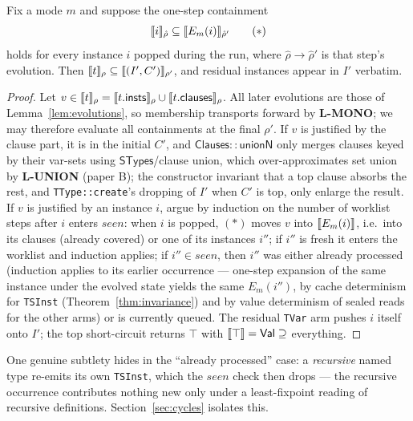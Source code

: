 \documentclass[11pt]{article}
\newcommand{\STypes}{\mathsf{STypes}}
\newcommand{\Clauses}{\mathsf{Clauses}}
\begin{document}
\begin{lemma}
\label{lem:plumbing}
Fix a mode $m$ and suppose the one-step containment
\[
\llbracket i \rrbracket_{\hat\rho} \subseteq \llbracket E_m(i) \rrbracket_{\hat\rho'}
\tag{$\ast$}
\]
holds for every instance $i$ popped during the run, where
$\hat\rho \to \hat\rho'$ is that step's evolution. Then
$\llbracket t \rrbracket_\rho \subseteq \llbracket (I', C') \rrbracket_{\rho'}$, and residual instances
appear in $I'$ verbatim.
\end{lemma}
\begin{proof}
Let $v \in \llbracket t \rrbracket_\rho = \llbracket t.\mathsf{insts} \rrbracket_\rho \cup
\llbracket t.\mathsf{clauses} \rrbracket_\rho$. All later evolutions are those of
Lemma~\ref{lem:evolutions}, so membership transports forward by
\textbf{L-MONO}; we may therefore evaluate all containments at the final
$\rho'$. If $v$ is justified by the clause part, it is in the initial
$C'$, and $\Clauses{::}\mathsf{unionN}$ only merges clauses keyed by
their var-sets using $\STypes$/clause union, which over-approximates set
union by \textbf{L-UNION} (paper B); the constructor invariant that a top
clause absorbs the rest, and \texttt{TType::create}'s dropping of $I'$
when $C'$ is top, only enlarge the result. If $v$ is justified by an
instance $i$, argue by induction on the number of worklist steps after
$i$ enters $\mathit{seen}$: when $i$ is popped, $(\ast)$ moves $v$ into
$\llbracket E_m(i) \rrbracket$, i.e.\ into its clauses (already covered) or one of its
instances $i''$; if $i''$ is fresh it enters the worklist and induction
applies; if $i'' \in \mathit{seen}$, then $i''$ was either already
processed (induction applies to its earlier occurrence — one-step
expansion of the same instance under the evolved state yields the same
$E_m(i'')$, by cache determinism for \texttt{TSInst}
(Theorem~\ref{thm:invariance}) and by value determinism of sealed reads
for the other arms) or is currently queued. The residual \texttt{TVar}
arm pushes $i$ itself onto $I'$; the top short-circuit returns $\top$
with $\llbracket \top \rrbracket = \mathsf{Val} \supseteq$ everything. \qedhere
\end{proof}

One genuine subtlety hides in the ``already processed'' case: a
\emph{recursive} named type re-emits its own \texttt{TSInst}, which the
$\mathit{seen}$ check then drops — the recursive occurrence contributes
nothing new only under a least-fixpoint reading of recursive definitions.
Section~\ref{sec:cycles} isolates this.
\end{document}
